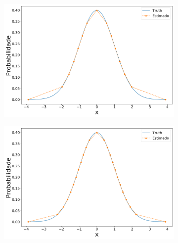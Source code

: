 \begin{figure}[H]
	\centering
	\begin{subfigure}[b]{0.45\textwidth}
		\centering 
		\includegraphics[width=\linewidth]{./figuras/PDFm_normal_15}
		\caption{}
		\label{fig:pdfnorm15}
	\end{subfigure}
	\hfill
	\begin{subfigure}[b]{0.45\textwidth}
		\centering 
		\includegraphics[width=\linewidth]{./figuras/PDFm_normal_25}
		\caption{}
		\label{fig:pdfnorm25}
	\end{subfigure}
	

\end{figure}
